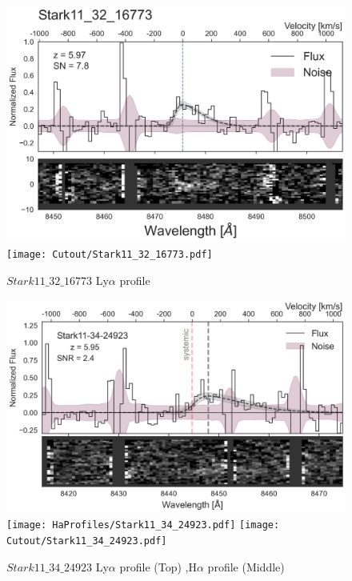 \documentclass[12pt,english]{article}
\begin{document}
\begin{figure}
\begin{center}\includegraphics[width=12cm, trim=0.1cm 0cm 0cm -1cm]{LyaProfiles/Stark11_32_16773.png}
\texttt{[image: Cutout/Stark11\_32\_16773.pdf]}
\caption{$Stark11\_32\_16773$ Ly$\alpha$ profile}
\end{center}
\end{figure}
\clearpage
\begin{figure}
\begin{center}\includegraphics[width=12cm, trim=0.1cm 0cm 0cm -1cm]{LyaProfiles/Stark11_34_24923.png}
\texttt{[image: HaProfiles/Stark11\_34\_24923.pdf]}
\texttt{[image: Cutout/Stark11\_34\_24923.pdf]}
\caption{$Stark11\_34\_24923$ Ly$\alpha$ profile (Top) ,H$\alpha$ profile (Middle)}
\end{center}
\end{figure}
\clearpage
\end{document}
